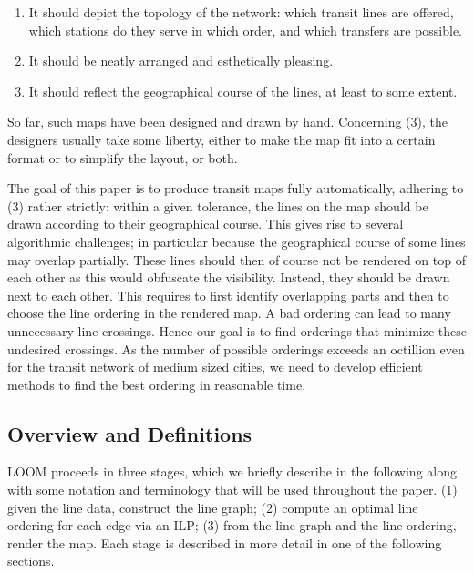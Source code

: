 \documentclass[format=acmsmall, review=false, screen=true]{acmart}
\begin{document}
\begin{enumerate}[parsep=0.5mm, wide, labelwidth=0mm, itemindent=2.3mm]
  \setlength\itemsep{0pt}
\item  It should depict the topology of the network: which transit lines are offered, which stations do they serve in which order, and which transfers are possible.
\item It should be neatly arranged and esthetically pleasing.
\item It should reflect the geographical course of the lines, at least to some extent.
\end{enumerate}

\smallskip\noindent
So far, such maps have been designed and drawn by hand.
Concerning (3), the designers usually take some liberty, either to make the map fit into a certain format or to simplify the layout, or both.

The goal of this paper is to produce transit maps fully automatically, adhering to (3) rather strictly: within a given tolerance, the lines on the map should be drawn according to their geographical course. This gives rise to several algorithmic challenges; in particular because the geographical course of some lines may overlap partially. These lines should then of course not be rendered on top of each other as this would obfuscate the visibility. Instead, they should be drawn next to each other. This requires to first identify overlapping parts and then to choose the line ordering in the rendered map. A bad ordering can lead to many unnecessary line crossings. Hence our goal is to find orderings that minimize these undesired crossings. As the number of possible orderings exceeds an octillion even for the transit network of medium sized cities, we need to develop efficient methods to find the best ordering in reasonable time.

\def\Hl{L}

\subsection{Overview and Definitions}\label{SEC:intro:definition}

LOOM proceeds in three stages, which we briefly describe in the following along with some notation and terminology that will be used throughout the paper.
(1) given the line data, construct the line graph; (2) compute an optimal line ordering for each edge via an ILP; (3) from the line graph and the line ordering, render the map.
Each stage is described in more detail in one of the following sections.
\end{document}
